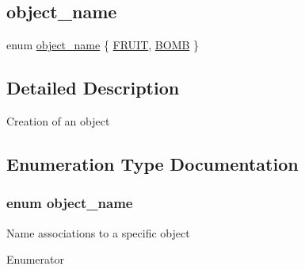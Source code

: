 \subsection*{object\+\_\+name}
\begin{DoxyCompactItemize}
\item 
enum \hyperlink{group__object_ga90ab20efa1890ce46e743d7569ce7cec}{object\+\_\+name} \{ \hyperlink{group__object_gga90ab20efa1890ce46e743d7569ce7ceca61dca5db46c7857556e7eaced30c879b}{F\+R\+U\+IT}, 
\hyperlink{group__object_gga90ab20efa1890ce46e743d7569ce7ceca095285ba8fb2e1f9cfb29c80546f06e4}{B\+O\+MB}
 \}
\end{DoxyCompactItemize}


\subsection{Detailed Description}
Creation of an object 

\subsection{Enumeration Type Documentation}
\subsubsection[{\texorpdfstring{object\+\_\+name}{object_name}}]{\setlength{\rightskip}{0pt plus 5cm}enum {\bf object\+\_\+name}}\hypertarget{group__object_ga90ab20efa1890ce46e743d7569ce7cec}{}\label{group__object_ga90ab20efa1890ce46e743d7569ce7cec}
Name associations to a specific object \begin{Desc}
\item[Enumerator]\par
\begin{description}
\item[{\em 
F\+R\+U\+IT\hypertarget{group__object_gga90ab20efa1890ce46e743d7569ce7ceca61dca5db46c7857556e7eaced30c879b}{}\label{group__object_gga90ab20efa1890ce46e743d7569ce7ceca61dca5db46c7857556e7eaced30c879b}
}]\item[{\em 
B\+O\+MB\hypertarget{group__object_gga90ab20efa1890ce46e743d7569ce7ceca095285ba8fb2e1f9cfb29c80546f06e4}{}\label{group__object_gga90ab20efa1890ce46e743d7569ce7ceca095285ba8fb2e1f9cfb29c80546f06e4}
}]\end{description}
\end{Desc}


